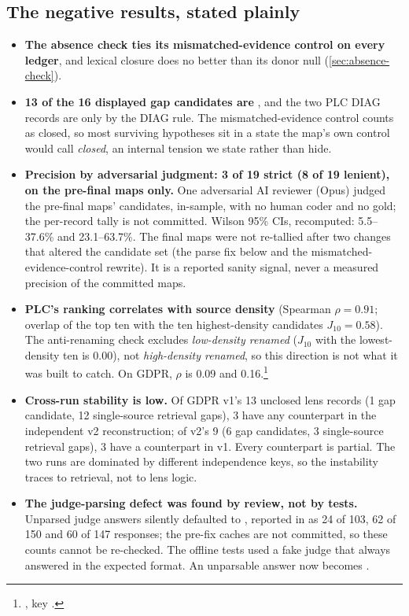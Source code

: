 \subsection{The negative results, stated plainly}

\begin{itemize}[noitemsep]
  \item \textbf{The absence check ties its mismatched-evidence control on every ledger}, and lexical closure does
    no better than its donor null (\cref{sec:absence-check}).
  \item \textbf{13 of the 16 displayed gap candidates are }, and the two PLC DIAG
    records are  only by the DIAG rule. \evint{} The mismatched-evidence control counts 
    as closed, so most surviving hypotheses sit in a state the map's own control would call
    \emph{closed}, an internal tension we state rather than hide.
  \item \textbf{Precision by adversarial judgment: 3 of 19 strict (8 of 19 lenient), on the
    pre-final maps only.} \evobs{} One adversarial AI reviewer (Opus) judged the pre-final maps'
    candidates, in-sample, with no human coder and no gold; the per-record tally is not committed.
    Wilson 95\% CIs, recomputed: 5.5--37.6\% and 23.1--63.7\%. The final maps were not re-tallied
    after two changes that altered the candidate set (the parse fix below and the mismatched-evidence-control
    rewrite). It is a reported sanity signal, never a measured precision of the committed maps.
  \item \textbf{PLC's ranking correlates with source density} (Spearman $\rho = 0.91$; overlap of
    the top ten with the ten highest-density candidates $J_{10} = 0.58$). \evint{} The anti-renaming
    check excludes \emph{low-density renamed} ($J_{10}$ with the lowest-density ten is 0.00), not
    \emph{high-density renamed}, so this direction is not what it was built to catch. On GDPR,
    $\rho$ is 0.09 and 0.16.\footnote{, key
    .}
  \item \textbf{Cross-run stability is low.} \evobs{} Of GDPR v1's 13 unclosed lens records (1 gap
    candidate, 12 single-source retrieval gaps), 3 have any counterpart in the independent v2
    reconstruction; of v2's 9 (6 gap candidates, 3 single-source retrieval gaps), 3 have a
    counterpart in v1. Every counterpart is partial. \evint{} The two runs are dominated by different
    independence keys, so the instability traces to retrieval, not to lens logic.
  \item \textbf{The judge-parsing defect was found by review, not by tests.} \evobs{} Unparsed
    judge answers silently defaulted to , reported in  as 24 of 103,
    62 of 150 and 60 of 147 responses; the pre-fix caches are not committed, so these counts cannot
    be re-checked. The offline tests used a fake judge that always answered in the expected format.
    An unparsable answer now becomes .
\end{itemize}

